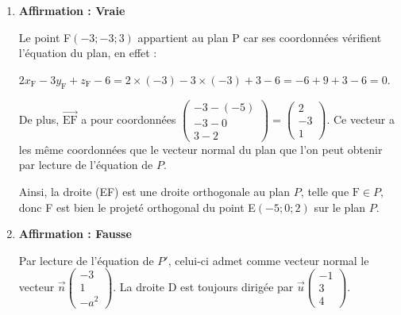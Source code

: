 \documentclass[10pt]{article}
\providecommand{\vect}[1]{\overrightarrow{#1}}
\begin{document}
\begin{enumerate}
$\begin{aligned}
\begin{cases}
t = 7-2t'\\
3t' = 18\\
9t' = 27
\end{cases}
&\iff
\begin{cases}
t = 7-2t'\\
t' = 6\\
t' = 3
\end{cases}\\
\end{aligned}$

Les équations du système sont incompatibles, donc le système n'a pas de solution, et les droites D et $\Delta$ n'ont aucun point commun : elle ne sont donc pas sécantes.

\item \textbf{Affirmation : Vraie}

Le point F$(-3 ;-3 ; 3)$ appartient au plan P car ses coordonnées vérifient l'équation du plan, en effet :

$2x_{\mathrm{F}} -3y_{\mathrm{F}}+z_{\mathrm{F}}-6 = 2\times (-3) - 3\times (-3) + 3 - 6 = -6 + 9 + 3 - 6 = 0$.

De plus, $\vect{\mathrm{EF}}$ a pour coordonnées $\begin{pmatrix}-3 - (-5) \\ -3 - 0\\3 - 2\end{pmatrix} = \begin{pmatrix}2\\-3\\1\end{pmatrix}$. Ce vecteur a les même coordonnées que le vecteur normal du plan que l'on peut obtenir par lecture de l'équation de $P$.

Ainsi, la droite (EF) est une droite orthogonale au plan $P$, telle que $\mathrm{F} \in P$, donc F est bien le projeté orthogonal du point E$(-5 ; 0 ; 2)$ sur le plan $P$.

\item \textbf{Affirmation : Fausse}

Par lecture de l'équation de $P'$, celui-ci admet comme vecteur normal le vecteur $\vect{n}\begin{pmatrix}-3\\1\\-a^2\end{pmatrix}$. La droite D est toujours dirigée par $\vect{u}\begin{pmatrix}-1\\3\\4\end{pmatrix}$.


\end{enumerate}
\end{document}
